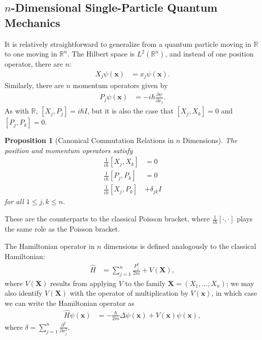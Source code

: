 \documentclass[12pt]{extarticle}
\newcommand{\R}{\mathbb{R}}
\theoremstyle{plain}
\newtheorem*{proposition}{Proposition}%
\theoremstyle{definition}
\theoremstyle{remark}
\renewcommand{\newline}{\hfill\break}
\begin{document}
  \subsection{$n$-Dimensional Single-Particle Quantum Mechanics}%
  It is relatively straightforward to generalize from a quantum particle moving in $\R$ to one moving in $\R^n$. The Hilbert space is $L^{2}(\R^n)$, and instead of one position operator, there are $n$:
  \begin{align*}
    X_j\psi(\mathbf{x}) &= x_j\psi(\mathbf{x}).
  \end{align*}
  Similarly, there are $n$ momentum operators given by
  \begin{align*}
    P_j\psi(\mathbf{x}) &= -i\hbar \frac{\partial \psi}{\partial x_j}.
  \end{align*}
  As with $\R$, $[X_j,P_j] = i\hbar I$, but it is also the case that $[X_j,X_k] = 0$ and $[P_j,P_k] = 0$.
  \begin{proposition}[Canonical Commutation Relations in $n$ Dimensions]
    The position and momentum operators satisfy
    \begin{align*}
      \frac{1}{i\hbar}[X_j,X_k] &= 0\\
      \frac{1}{i\hbar}[P_j,P_k] &= 0\\
      \frac{1}{i\hbar}[X_j,P_k] &+ \delta_{jk}I
    \end{align*}
    for all $1 \leq j,k \leq n$.
  \end{proposition}
  These are the counterparts to the classical Poisson bracket, where $\frac{1}{i\hbar}[\cdot,\cdot]$ plays the same role as the Poisson bracket.\newline

  The Hamiltonian operator in $n$ dimensions is defined analogously to the classical Hamiltonian:
  \begin{align*}
    \hat{H} &= \sum_{j=1}^{n}\frac{P_j^2}{2m} + V(\mathbf{X}),
  \end{align*}
  where $V(\mathbf{X})$ results from applying $V$ to the family $\mathbf{X} = (X_1,\dots,X_n)$; we may also identify $V(\mathbf{X})$ with the operator of multiplication by $V(\mathbf{x})$, in which case we can write the Hamiltonian operator as
  \begin{align*}
    \hat{H}\psi(\mathbf{x}) &= -\frac{\hbar}{2m}\Delta \psi(\mathbf{x}) + V(\mathbf{x})\psi(\mathbf{x}),
  \end{align*}
  where $\delta = \sum_{j=1}^{n}\frac{\partial^2}{\partial x_j^2}$.\newline
\end{document}
